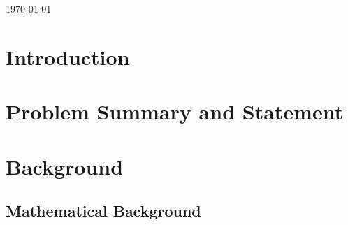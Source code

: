 \documentclass{article}
\theoremstyle{definition}
\begin{document}
\begin{titlepage}


{\large \today}\\[2cm] %


 

\vfill %

\end{titlepage}

\tableofcontents \newpage

\section{Introduction}


\section{Problem Summary and Statement}





\section{Background}


\subsection{Mathematical Background}
\end{document}
